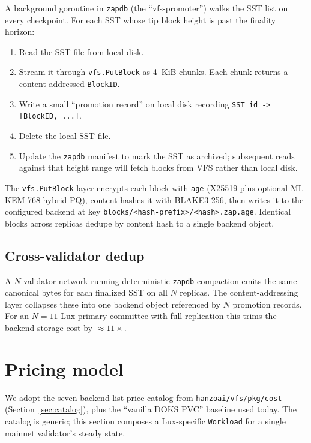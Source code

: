 \documentclass[11pt,a4paper]{article}
\begin{document}
A background goroutine in \texttt{zapdb} (the ``vfs-promoter'') walks
the SST list on every checkpoint. For each SST whose tip block height
is past the finality horizon:

\begin{enumerate}[noitemsep]
  \item Read the SST file from local disk.
  \item Stream it through \texttt{vfs.PutBlock} as 4~KiB chunks. Each
    chunk returns a content-addressed \texttt{BlockID}.
  \item Write a small ``promotion record'' on local disk recording
    \verb|SST_id -> [BlockID, ...]|.
  \item Delete the local SST file.
  \item Update the \texttt{zapdb} manifest to mark the SST as
    archived; subsequent reads against that height range will fetch
    blocks from VFS rather than local disk.
\end{enumerate}

The \texttt{vfs.PutBlock} layer encrypts each block with \texttt{age}
(X25519 plus optional ML-KEM-768 hybrid PQ), content-hashes it with
BLAKE3-256, then writes it to the configured backend at key
\verb|blocks/<hash-prefix>/<hash>.zap.age|. Identical blocks across
replicas dedupe by content hash to a single backend object.

\subsection{Cross-validator dedup}

A $N$-validator network running deterministic \texttt{zapdb}
compaction emits the same canonical bytes for each finalized SST on
all $N$ replicas. The content-addressing layer collapses these into
one backend object referenced by $N$ promotion records. For an
$N=11$ Lux primary committee with full replication this trims the
backend storage cost by $\approx 11\times$.

\section{Pricing model}

We adopt the seven-backend list-price catalog from
\texttt{hanzoai/vfs/pkg/cost} (Section~\ref{sec:catalog}), plus the
``vanilla DOKS PVC'' baseline used today. The catalog is generic; this
section composes a Lux-specific \texttt{Workload} for a single
mainnet validator's steady state.
\end{document}
